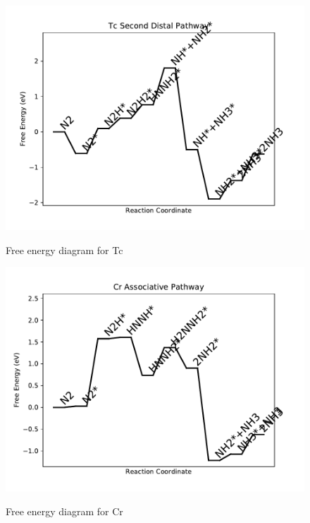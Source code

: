 \documentclass{article}
\begin{document}
\newpage
\begin{figure}
\includegraphics[width=1\linewidth]{data/plots/Tc_distal_2.pdf}
\label{fig:Tc_distal_2}
\caption{Free energy diagram for Tc}
\end{figure}

\begin{figure}
\includegraphics[width=1\linewidth]{data/plots/Cr_associative.pdf}
\label{fig:Cr_associative}
\caption{Free energy diagram for Cr}
\end{figure}
\end{document}
